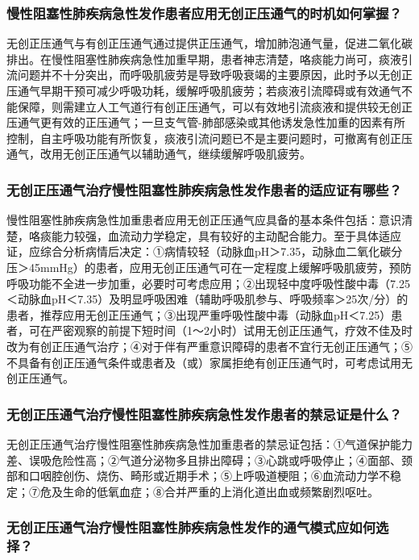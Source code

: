 \subsubsection{慢性阻塞性肺疾病急性发作患者应用无创正压通气的时机如何掌握？}

无创正压通气与有创正压通气通过提供正压通气，增加肺泡通气量，促进二氧化碳排出。在慢性阻塞性肺疾病急性加重早期，患者神志清楚，咯痰能力尚可，痰液引流问题并不十分突出，而呼吸肌疲劳是导致呼吸衰竭的主要原因，此时予以无创正压通气早期干预可减少呼吸功耗，缓解呼吸肌疲劳；若痰液引流障碍或有效通气不能保障，则需建立人工气道行有创正压通气，可以有效地引流痰液和提供较无创正压通气更有效的正压通气；一旦支气管-肺部感染或其他诱发急性加重的因素有所控制，自主呼吸功能有所恢复，痰液引流问题已不是主要问题时，可撤离有创正压通气，改用无创正压通气以辅助通气，继续缓解呼吸肌疲劳。

\subsubsection{无创正压通气治疗慢性阻塞性肺疾病急性发作患者的适应证有哪些？}

慢性阻塞性肺疾病急性加重患者应用无创正压通气应具备的基本条件包括：意识清楚，咯痰能力较强，血流动力学稳定，具有较好的主动配合能力。至于具体适应证，应综合分析病情后决定：①病情较轻（动脉血pH＞7.35，动脉血二氧化碳分压＞45mmHg）的患者，应用无创正压通气可在一定程度上缓解呼吸肌疲劳，预防呼吸功能不全进一步加重，必要时可考虑应用；②出现轻中度呼吸性酸中毒（7.25＜动脉血pH＜7.35）及明显呼吸困难（辅助呼吸肌参与、呼吸频率＞25次/分）的患者，推荐应用无创正压通气；③出现严重呼吸性酸中毒（动脉血pH＜7.25）患者，可在严密观察的前提下短时间（1～2小时）试用无创正压通气，疗效不佳及时改为有创正压通气治疗；④对于伴有严重意识障碍的患者不宜行无创正压通气；⑤不具备有创正压通气条件或患者及（或）家属拒绝有创正压通气时，可考虑试用无创正压通气。

\subsubsection{无创正压通气治疗慢性阻塞性肺疾病急性发作患者的禁忌证是什么？}

无创正压通气治疗慢性阻塞性肺疾病急性加重患者的禁忌证包括：①气道保护能力差、误吸危险性高；②气道分泌物多且排出障碍；③心跳或呼吸停止；④面部、颈部和口咽腔创伤、烧伤、畸形或近期手术；⑤上呼吸道梗阻；⑥血流动力学不稳定；⑦危及生命的低氧血症；⑧合并严重的上消化道出血或频繁剧烈呕吐。

\subsubsection{无创正压通气治疗慢性阻塞性肺疾病急性发作的通气模式应如何选择？}

